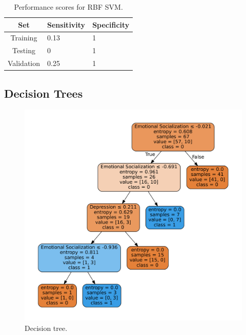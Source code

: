 \documentclass[conference]{IEEEtran}
\theoremstyle{definition}
\theoremstyle{remark}
\theoremstyle{remark}
\begin{document}
\begin{table}
\centering
\caption{Performance scores for RBF SVM.}
\label{tab:rbf_SVM}
\begin{tabular}{cll}
\hline
\textbf{Set} & \multicolumn{1}{c}{\textbf{Sensitivity}} & \multicolumn{1}{c}{\textbf{Specificity}} \\ \hline
Training & 0.13 & 1 \\
Testing & 0 & 1 \\
Validation & 0.25 & 1 \\ \hline
\end{tabular}
\end{table}

\subsection{Decision Trees}
\begin{figure}
    \includegraphics[width=\columnwidth]{figs/tree-graph.pdf}
    \caption{Decision tree.}
    \label{fig:dt}
\end{figure}
\end{document}
